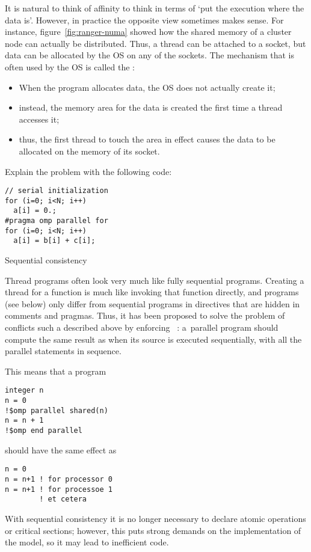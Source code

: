 It is natural to think of affinity to think in terms of `put the
execution where the data is'. However, in practice the opposite view
sometimes makes sense.  For instance, figure~\ref{fig:ranger-numa}
showed how the shared memory of a cluster node can actually be
distributed. Thus, a thread can be attached to a socket, but data can
be allocated by the \ac{OS} on any of the sockets.  The mechanism that
is often used by the \ac{OS} is called the :
\begin{itemize}
\item When the program allocates data, the \ac{OS} does not actually
  create it;
\item instead, the memory area for the data is created the first
  time a thread accesses it;
\item thus, the first thread to touch the area in effect causes the
  data to be allocated on the memory of its socket.
\end{itemize}

\begin{exercise}
  Explain the problem with the following code:
\begin{verbatim}
// serial initialization
for (i=0; i<N; i++)
  a[i] = 0.;
#pragma omp parallel for
for (i=0; i<N; i++)
  a[i] = b[i] + c[i];
\end{verbatim}
\end{exercise}


 {Sequential consistency}
\label{sec:seq-consist}

Thread programs often look very much like fully sequential
programs. Creating a thread for a function is much like invoking that
function directly, and  programs (see below) only
differ from sequential programs in directives that are hidden in
comments and pragmas. Thus, it has been proposed to solve the problem
of conflicts such a described above by enforcing ~\cite{Lamport:sequential}: a~parallel program should
compute the same result as when its source is executed sequentially,
with all the parallel statements in sequence.

This means that a program
\begin{verbatim}
integer n
n = 0
!$omp parallel shared(n)
n = n + 1
!$omp end parallel
\end{verbatim}
should have the same effect as
\begin{verbatim}
n = 0
n = n+1 ! for processor 0
n = n+1 ! for processoe 1
        ! et cetera
\end{verbatim}
With sequential consistency it is no longer necessary to declare
atomic operations or critical sections; however, this puts strong
demands on the implementation of the model, so it may lead to
inefficient code.

